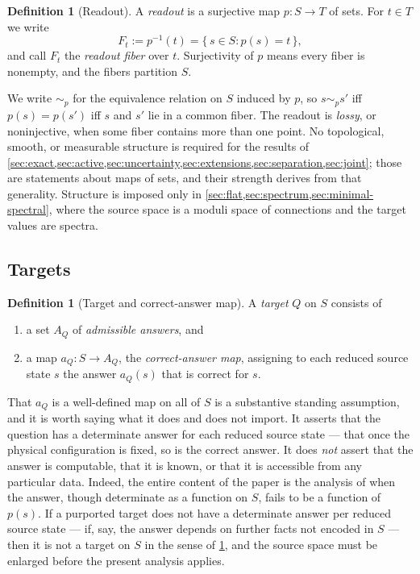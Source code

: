 \documentclass[11pt,reqno]{amsart}
\theoremstyle{plain}
\theoremstyle{definition}
\newtheorem{definition}[theorem]{Definition}
\newcommand{\Src}{S}
\newcommand{\Rdt}{T}
\begin{document}
\begin{definition}[Readout]\label{def:readout}
A \emph{readout} is a surjective map $p\colon\Src\to\Rdt$ of sets. For $t\in\Rdt$ we write
\begin{equation}\label{eq:fiber}
F_t := p^{-1}(t) = \{\, s\in\Src : p(s)=t \,\},
\end{equation}
and call $F_t$ the \emph{readout fiber} over $t$. Surjectivity of $p$ means every fiber is
nonempty, and the fibers partition $\Src$.
\end{definition}

We write $\sim_p$ for the equivalence relation on $\Src$ induced by $p$, so $s\sim_p s'$ iff
$p(s)=p(s')$ iff $s$ and $s'$ lie in a common fiber. The readout is \emph{lossy}, or
noninjective, when some fiber contains more than one point. No topological, smooth, or measurable
structure is required for the results of
\cref{sec:exact,sec:active,sec:uncertainty,sec:extensions,sec:separation,sec:joint}; those are
statements about maps of sets, and their strength derives from that generality. Structure is
imposed only in \cref{sec:flat,sec:spectrum,sec:minimal-spectral}, where the source space is a
moduli space of connections and the target values are spectra.

\subsection{Targets}

\begin{definition}[Target and correct-answer map]\label{def:target}
A \emph{target} $Q$ on $\Src$ consists of
\begin{enumerate}
\item a set $A_Q$ of \emph{admissible answers}, and
\item a map $a_Q\colon\Src\to A_Q$, the \emph{correct-answer map}, assigning to each reduced
source state $s$ the answer $a_Q(s)$ that is correct for $s$.
\end{enumerate}
\end{definition}

That $a_Q$ is a well-defined map on all of $\Src$ is a substantive standing assumption, and it is
worth saying what it does and does not import. It asserts that the question has a determinate
answer for each reduced source state --- that once the physical configuration is fixed, so is the
correct answer. It does \emph{not} assert that the answer is computable, that it is known, or
that it is accessible from any particular data. Indeed, the entire content of the paper is the
analysis of when the answer, though determinate as a function on $\Src$, fails to be a function
of $p(s)$. If a purported target does not have a determinate answer per reduced source state ---
if, say, the answer depends on further facts not encoded in $\Src$ --- then it is not a target on
$\Src$ in the sense of \cref{def:target}, and the source space must be enlarged before the
present analysis applies.
\end{document}
